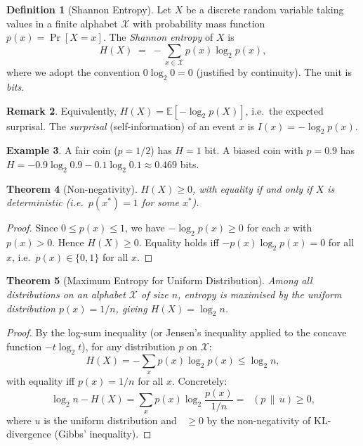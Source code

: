 \documentclass[12pt,a4paper]{amsart}
\newtheorem{theorem}{Theorem}[section]
\theoremstyle{definition}
\newtheorem{definition}[theorem]{Definition}
\newtheorem{example}[theorem]{Example}
\newtheorem{remark}[theorem]{Remark}
\theoremstyle{remark}
\DeclareMathOperator{\KL}{D_{KL}}
\newcommand{\E}{\mathbb{E}}
\begin{document}
\begin{definition}[Shannon Entropy]
Let $X$ be a discrete random variable taking values in a finite alphabet
$\mathcal{X}$ with probability mass function $p(x) = \Pr[X = x]$.
The \emph{Shannon entropy} of $X$ is
\begin{equation}\label{eq:entropy}
  H(X) \;=\; -\sum_{x \in \mathcal{X}} p(x)\log_2 p(x),
\end{equation}
where we adopt the convention $0 \log_2 0 = 0$ (justified by continuity).
The unit is \emph{bits}.
\end{definition}

\begin{remark}
Equivalently, $H(X) = \E[-\log_2 p(X)]$, i.e.\ the expected surprisal.
The \emph{surprisal} (self-information) of an event $x$ is $I(x) = -\log_2 p(x)$.
\end{remark}

\begin{example}
A fair coin ($p = 1/2$) has $H = 1$ bit. A biased coin with $p = 0.9$ has
$H = -0.9\log_2 0.9 - 0.1\log_2 0.1 \approx 0.469$ bits.
\end{example}

\begin{theorem}[Non-negativity]\label{thm:nonneg}
$H(X) \geq 0$, with equality if and only if $X$ is deterministic (i.e.\ $p(x^*)=1$
for some $x^*$).
\end{theorem}
\begin{proof}
Since $0 \leq p(x) \leq 1$, we have $-\log_2 p(x) \geq 0$ for each $x$ with
$p(x)>0$. Hence $H(X) \geq 0$. Equality holds iff $-p(x)\log_2 p(x)=0$ for all
$x$, i.e.\ $p(x) \in \{0,1\}$ for all $x$.
\end{proof}

\begin{theorem}[Maximum Entropy for Uniform Distribution]\label{thm:maxent}
Among all distributions on an alphabet $\mathcal{X}$ of size $n$, entropy is
maximised by the uniform distribution $p(x) = 1/n$, giving $H(X) = \log_2 n$.
\end{theorem}
\begin{proof}
By the log-sum inequality (or Jensen's inequality applied to the concave function
$-t\log_2 t$), for any distribution $p$ on $\mathcal{X}$:
\[
  H(X) = -\sum_x p(x)\log_2 p(x) \leq \log_2 n,
\]
with equality iff $p(x) = 1/n$ for all $x$. Concretely:
\[
  \log_2 n - H(X) = \sum_x p(x)\log_2\!\frac{p(x)}{1/n} = \KL(p \,\|\, u) \geq 0,
\]
where $u$ is the uniform distribution and $\KL \geq 0$ by the non-negativity of
KL-divergence (Gibbs' inequality).
\end{proof}
\end{document}
